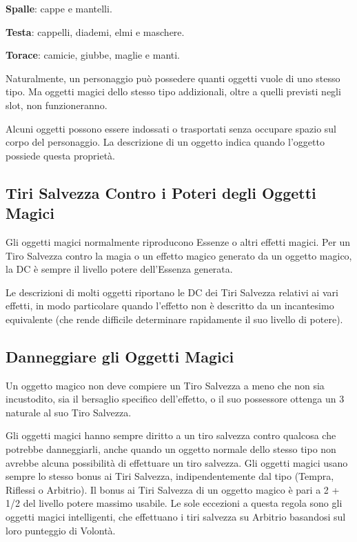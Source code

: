 \documentclass[a4paper,11pt,twoside,openany]{book}
\begin{document}
{\textbf{Spalle}: cappe e mantelli.

\textbf{Testa}: cappelli, diademi, elmi e maschere.

\textbf{Torace}: camicie, giubbe, maglie e manti.

Naturalmente, un personaggio può possedere quanti oggetti vuole di uno stesso tipo. Ma oggetti magici dello stesso tipo addizionali, oltre a quelli previsti negli slot, non funzioneranno. 

Alcuni oggetti possono essere indossati o trasportati senza occupare spazio sul corpo del personaggio. La descrizione di un oggetto indica quando l'oggetto possiede questa proprietà.


\subsection{Tiri Salvezza Contro i Poteri degli Oggetti Magici}

\label{tiri-salvezza-contro-i-poteri-degli-oggetti-magici}

Gli oggetti magici normalmente riproducono Essenze o altri effetti magici. Per un Tiro Salvezza contro la magia o un effetto magico generato da un oggetto magico, la DC è sempre il livello potere dell'Essenza generata.

Le descrizioni di molti oggetti riportano le DC dei Tiri Salvezza relativi ai vari effetti, in modo particolare quando l'effetto non è descritto da un incantesimo equivalente (che rende difficile determinare rapidamente il suo livello di potere).


\subsection{Danneggiare gli Oggetti Magici}

\label{danneggiare-gli-oggetti-magici}

Un oggetto magico non deve compiere un Tiro Salvezza a meno che non sia incustodito, sia il bersaglio specifico dell'effetto, o il suo possessore ottenga un 3 naturale al suo Tiro Salvezza. 

Gli oggetti magici hanno sempre diritto a un tiro salvezza contro qualcosa che potrebbe danneggiarli, anche quando un oggetto normale dello stesso tipo non avrebbe alcuna possibilità di effettuare un tiro salvezza. Gli oggetti magici usano sempre lo stesso bonus ai Tiri Salvezza, indipendentemente dal tipo (Tempra, Riflessi o Arbitrio). Il bonus ai Tiri Salvezza di un oggetto magico è pari a 2 + 1/2 del livello potere massimo usabile. Le sole eccezioni a questa regola sono gli oggetti magici intelligenti, che effettuano i tiri salvezza su Arbitrio basandosi sul loro punteggio di Volontà.


}
\end{document}
